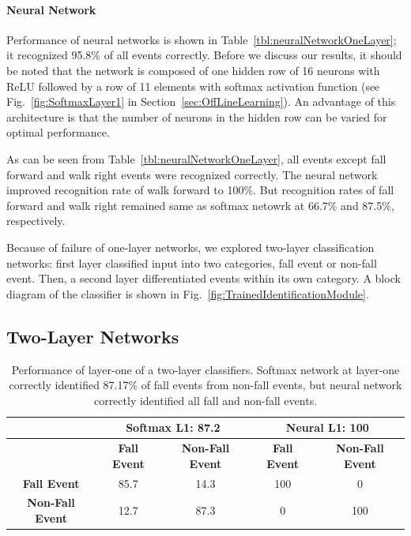 \documentclass{IEEEtran}
\begin{document}
\paragraph{Neural Network}
\label{sec:NeuralNetwork2}
Performance of neural networks is shown in Table~\ref{tbl:neuralNetworkOneLayer}; it recognized 95.8\% of all events correctly. Before we discuss our results, it should be noted that the network is composed of one hidden row of  16 neurons with ReLU followed by a row of 11 elements with softmax activation function (see Fig.~\ref{fig:SoftmaxLayer1} in Section~\ref{sec:OffLineLearning}). An advantage of this architecture is that the number of neurons in the hidden row  can be varied for optimal performance.

\par
As can be seen from Table~\ref{tbl:neuralNetworkOneLayer}, all events except fall forward and walk right events were recognized correctly. The neural network improved recognition rate of walk forward to 100\%. But recognition rates of fall forward and walk right remained same as softmax netowrk at 66.7\% and 87.5\%, respectively.
\par
Because of failure of one-layer networks, we explored two-layer classification networks: first layer classified input into two categories, fall event or non-fall event. Then, a second layer  differentiated events within its own category. A block diagram of the classifier  is shown in Fig.~\ref{fig:TrainedIdentificationModule}.
\subsection{Two-Layer Networks}
\label{sec:TwoLayerNetworks}
\begin{table}[htb]
\caption{ Performance of layer-one of a two-layer classifiers. Softmax network at layer-one correctly identified 87.17\% of fall events from non-fall events, but neural network correctly identified all fall and non-fall events.}
\label{tbl:layer1RecognitionRates}
\resizebox{\columnwidth}{!}
{
\begin{tabular}{|c|c|c||c|c|}
\hline
& \multicolumn{2}{c||}{\bf Softmax L1: 87.2} & \multicolumn{2}{c|}{\bf Neural L1: 
100} \\ \hline
& \textbf{Fall Event} & \textbf{Non-Fall Event}  & \textbf{Fall Event} & \textbf{Non-Fall 
Event} \\ \hline
\textbf{Fall Event} & 85.7 &  14.3  & 100 &  0 \\ \hline
\textbf{Non-Fall Event} & 12.7 &  87.3 & 0 &  100 \\ \hline
\end{tabular}
}
\end{table}
\end{document}
